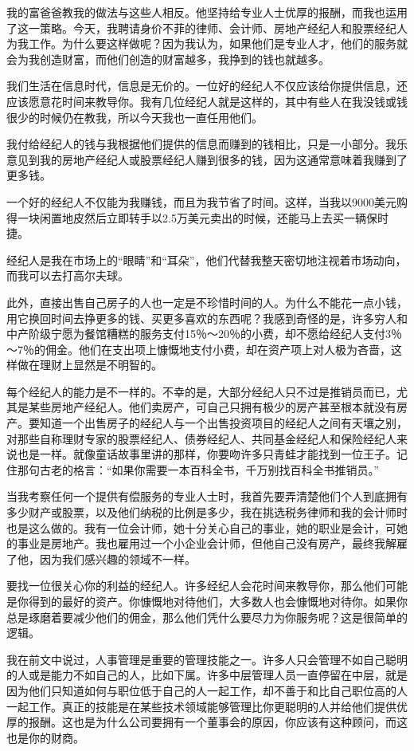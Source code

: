 我的富爸爸教我的做法与这些人相反。他坚持给专业人士优厚的报酬，而我也运用了这一策略。今天，我聘请身价不菲的律师、会计师、房地产经纪人和股票经纪人为我工作。为什么要这样做呢？因为我认为，如果他们是专业人才，他们的服务就会为我创造财富，而他们创造的财富越多，我挣到的钱也就越多。

我们生活在信息时代，信息是无价的。一位好的经纪人不仅应该给你提供信息，还应该愿意花时间来教导你。我有几位经纪人就是这样的，其中有些人在我没钱或钱很少的时候仍在教我，所以今天我也一直任用他们。

我付给经纪人的钱与我根据他们提供的信息而赚到的钱相比，只是一小部分。我乐意见到我的房地产经纪人或股票经纪人赚到很多的钱，因为这通常意味着我赚到了更多钱。

一个好的经纪人不仅能为我赚钱，而且为我节省了时间。这样，当我以9000美元购得一块闲置地皮然后立即转手以2.5万美元卖出的时候，还能马上去买一辆保时捷。

经纪人是我在市场上的“眼睛”和“耳朵”，他们代替我整天密切地注视着市场动向，而我可以去打高尔夫球。

此外，直接出售自己房子的人也一定是不珍惜时间的人。为什么不能花一点小钱，用它换回时间去挣更多的钱、买更多喜欢的东西呢？我感到奇怪的是，许多穷人和中产阶级宁愿为餐馆糟糕的服务支付15％～20％的小费，却不愿给经纪人支付3％～7％的佣金。他们在支出项上慷慨地支付小费，却在资产项上对人极为吝啬，这样做在理财上显然是不明智的。

每个经纪人的能力是不一样的。不幸的是，大部分经纪人只不过是推销员而已，尤其是某些房地产经纪人。他们卖房产，可自己只拥有极少的房产甚至根本就没有房产。要知道一个出售房子的经纪人与一个出售投资项目的经纪人之间有天壤之别，对那些自称理财专家的股票经纪人、债券经纪人、共同基金经纪人和保险经纪人来说也是一样。就像童话故事里讲的那样，你要吻许多只青蛙才能找到一位王子。记住那句古老的格言：“如果你需要一本百科全书，千万别找百科全书推销员。”

当我考察任何一个提供有偿服务的专业人士时，我首先要弄清楚他们个人到底拥有多少财产或股票，以及他们纳税的比例是多少，我在挑选税务律师和我的会计师时也是这么做的。我有一位会计师，她十分关心自己的事业，她的职业是会计，可她的事业是房地产。我也雇用过一个小企业会计师，但他自己没有房产，最终我解雇了他，因为我们感兴趣的领域不一样。

要找一位很关心你的利益的经纪人。许多经纪人会花时间来教导你，那么他们可能是你得到的最好的资产。你慷慨地对待他们，大多数人也会慷慨地对待你。如果你总是琢磨着要减少他们的佣金，那么他们凭什么要尽力为你服务呢？这是很简单的逻辑。

我在前文中说过，人事管理是重要的管理技能之一。许多人只会管理不如自己聪明的人或是能力不如自己的人，比如下属。许多中层管理人员一直停留在中层，就是因为他们只知道如何与职位低于自己的人一起工作，却不善于和比自己职位高的人一起工作。真正的技能是在某些技术领域能够管理比你更聪明的人并给他们提供优厚的报酬。这也是为什么公司要拥有一个董事会的原因，你应该有这种顾问，而这也是你的财商。

